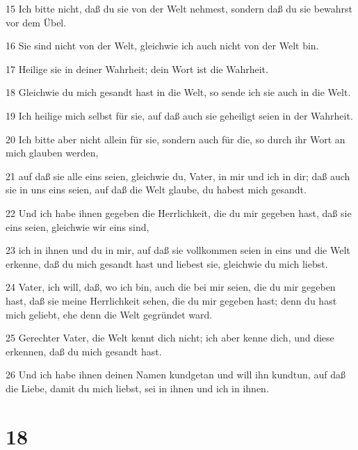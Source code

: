 \par 15 Ich bitte nicht, daß du sie von der Welt nehmest, sondern daß du sie bewahrst vor dem Übel.
\par 16 Sie sind nicht von der Welt, gleichwie ich auch nicht von der Welt bin.
\par 17 Heilige sie in deiner Wahrheit; dein Wort ist die Wahrheit.
\par 18 Gleichwie du mich gesandt hast in die Welt, so sende ich sie auch in die Welt.
\par 19 Ich heilige mich selbst für sie, auf daß auch sie geheiligt seien in der Wahrheit.
\par 20 Ich bitte aber nicht allein für sie, sondern auch für die, so durch ihr Wort an mich glauben werden,
\par 21 auf daß sie alle eins seien, gleichwie du, Vater, in mir und ich in dir; daß auch sie in uns eins seien, auf daß die Welt glaube, du habest mich gesandt.
\par 22 Und ich habe ihnen gegeben die Herrlichkeit, die du mir gegeben hast, daß sie eins seien, gleichwie wir eins sind,
\par 23 ich in ihnen und du in mir, auf daß sie vollkommen seien in eins und die Welt erkenne, daß du mich gesandt hast und liebest sie, gleichwie du mich liebst.
\par 24 Vater, ich will, daß, wo ich bin, auch die bei mir seien, die du mir gegeben hast, daß sie meine Herrlichkeit sehen, die du mir gegeben hast; denn du hast mich geliebt, ehe denn die Welt gegründet ward.
\par 25 Gerechter Vater, die Welt kennt dich nicht; ich aber kenne dich, und diese erkennen, daß du mich gesandt hast.
\par 26 Und ich habe ihnen deinen Namen kundgetan und will ihn kundtun, auf daß die Liebe, damit du mich liebst, sei in ihnen und ich in ihnen.

\chapter{18}

